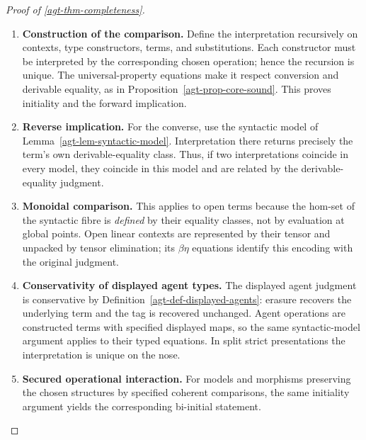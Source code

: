 \documentclass[11pt,a4paper]{article}
\numberwithin{equation}{section}
\theoremstyle{definition}
\theoremstyle{remark}
\theoremstyle{plain}
\begin{document}
\begin{proof}[Proof of \cref{agt-thm-completeness}]
\leavevmode
\begin{enumerate}[label=\textup{(\arabic*)},leftmargin=*,itemsep=4pt,topsep=3pt]
  \item \textbf{Construction of the comparison.} Define the interpretation recursively on contexts, type constructors,
terms, and substitutions. Each constructor must be interpreted by the
corresponding chosen operation; hence the recursion is unique. The
universal-property equations make it respect conversion and derivable
equality, as in Proposition~\ref{agt-prop-core-sound}. This proves initiality
and the forward implication.
  \item \textbf{Reverse implication.} For the converse, use the syntactic model of
Lemma~\ref{agt-lem-syntactic-model}. Interpretation there returns precisely
the term's own derivable-equality class. Thus, if two interpretations
coincide in every model, they coincide in this model and are related by
the derivable-equality judgment.
  \item \textbf{Monoidal comparison.} This applies to open terms because the
hom-set of the syntactic fibre is \emph{defined} by their equality
classes, not by evaluation at global points. Open linear contexts are
represented by their tensor
and unpacked by tensor elimination; its $\beta\eta$ equations identify this
encoding with the original judgment.
  \item \textbf{Conservativity of displayed agent types.} The displayed agent judgment is conservative by
Definition~\ref{agt-def-displayed-agents}: erasure recovers the underlying
term and the tag is recovered unchanged. Agent operations are constructed
terms with specified displayed maps, so the same syntactic-model argument
applies to their typed equations. In split strict presentations the interpretation is unique on the
nose.
  \item \textbf{Secured operational interaction.} For models and morphisms preserving the chosen structures by
specified coherent comparisons, the same initiality argument yields
the corresponding bi-initial statement.
\end{enumerate}
\end{proof}
\end{document}
